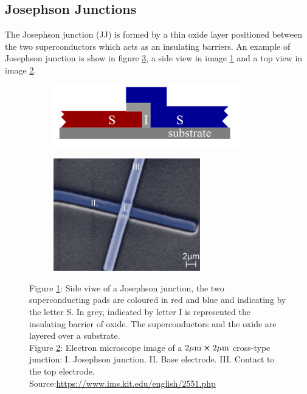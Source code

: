 \subsection{Josephson Junctions}
The Josephson junction (JJ) is formed by a thin oxide layer positioned between the two superconductors which acts as an insulating barriers. 
An example of Josephson junction is show in figure \ref{fig:JJ}, a side view in image \ref{fig:JJ_side} and a top view in image \ref{fig:JJ_top}.
\begin{figure}[ht!]
    \centering
    \begin{subfigure}{0.45\textwidth}
        \centering
        \includegraphics[width=0.90\textwidth]{figures/png/JJ_side.png}
        \subcaption{}
        \label{fig:JJ_side}
    \end{subfigure}
    \hfill
    \begin{subfigure}{0.45\textwidth}
        \centering
        \includegraphics[width=0.70\textwidth]{figures/png/JJ_top.png}
        \subcaption{}
        \label{fig:JJ_top}
    \end{subfigure}
    \caption{Figure \ref{fig:JJ_side}: Side viwe of a Josephson junction, the two superconducting pads are coloured in red and blue and indicating by the letter S. In grey, indicated by letter I is represented the insulating barrier of oxide. 
    The superconductors and the oxide are layered over a substrate.\\
    Figure \ref{fig:JJ_top}: Electron microscope image of a $2 \mu\text{m} \cross 2 \mu\text{m}$ cross-type junction: I. Josephson junction. II. Base electrode. III. Contact to the top electrode.\\
    Source:\url{https://www.ims.kit.edu/english/2551.php}}
    \label{fig:JJ}
\end{figure}

